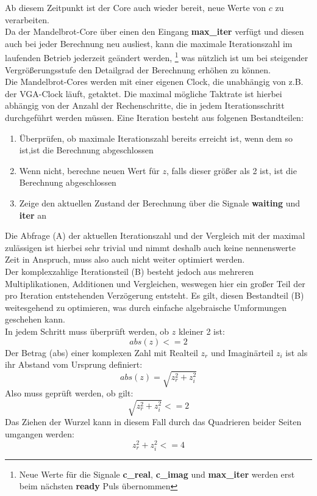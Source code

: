 \documentclass[a4paper,12pt,onesided]{report}
\begin{document}
Ab diesem Zeitpunkt ist der Core auch wieder bereit, neue Werte von $c$ zu verarbeiten.\\
Da der Mandelbrot-Core über einen den Eingang \textbf{max\_iter} verfügt und diesen auch bei jeder Berechnung neu ausliest, kann die maximale Iterationszahl im laufenden Betrieb jederzeit geändert werden,
\footnote{Neue Werte für die Signale \textbf{c\_real}, \textbf{c\_imag} und \textbf{max\_iter} werden erst beim nächsten \textbf{ready} Puls übernommen}
was nützlich ist um bei steigender Vergrößerungsstufe den Detailgrad der Berechnung erhöhen zu können.\\
Die Mandelbrot-Cores werden mit einer eigenen Clock, die unabhängig von z.B. der VGA-Clock läuft, getaktet.
Die maximal mögliche Taktrate ist hierbei abhängig von der Anzahl der Rechenschritte, die in jedem Iterationsschritt durchgeführt werden müssen.
Eine Iteration besteht aus folgenen Bestandteilen:
\begin{enumerate}[label=(\Alph*)]
	\item Überprüfen, ob maximale Iterationszahl bereits erreicht ist, wenn dem so ist,ist die Berechnung abgeschlossen
	\item Wenn nicht, berechne neuen Wert für $z$, falls dieser größer als 2 ist, ist die Berechnung abgeschlossen
	\item Zeige den aktuellen Zustand der Berechnung über die Signale \textbf{waiting} und \textbf{iter} an
\end{enumerate}
Die Abfrage (A) der aktuellen Iterationszahl und der Vergleich mit der maximal zulässigen ist hierbei sehr trivial und nimmt deshalb auch keine nennenswerte Zeit in Anspruch, muss also auch nicht weiter optimiert werden.\\
Der komplexzahlige Iterationsteil (B) besteht jedoch aus mehreren Multiplikationen, Additionen und Vergleichen, weswegen hier ein großer Teil der pro Iteration entstehenden Verzögerung entsteht.
Es gilt, diesen Bestandteil (B) weitesgehend zu optimieren, was durch einfache algebraische Umformungen geschehen kann.\\
In jedem Schritt muss überprüft werden, ob $z$ kleiner 2 ist:
\[abs(z) <= 2\]
Der Betrag (abs) einer komplexen Zahl mit Realteil $z_r$ und Imaginärteil $z_i$ ist als ihr Abstand vom Ursprung definiert:
\[abs(z) = \sqrt{z_r^2 + z_i^2}\]
Also muss geprüft werden, ob gilt:
\[\sqrt{z_r^2 + z_i^2} <= 2\]
Das Ziehen der Wurzel kann in diesem Fall durch das Quadrieren beider Seiten umgangen werden:
\begin{equation}
	\label{eq:bedingung}
	z_r^2 + z_i^2 <= 4
\end{equation}
\end{document}
